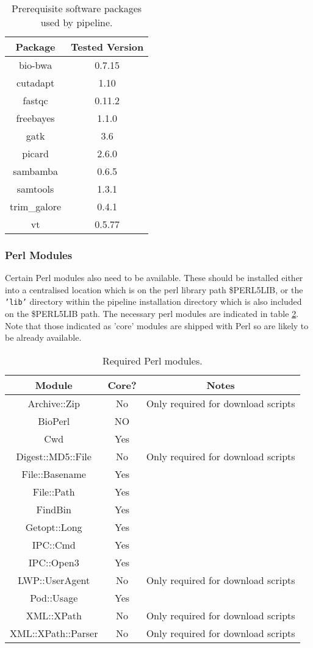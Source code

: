 \documentclass[a4paper,10pt,twoside]{article}
\begin{document}
\begin{table}
{\scriptsize
\begin{tabularx}{100pt}{@{}cc@{}}\toprule
Package	& Tested Version \\\midrule
bio-bwa		&	0.7.15 \\
cutadapt	&	1.10 \\
fastqc		&	0.11.2 \\
freebayes	&	1.1.0 \\
gatk		&	3.6 \\
picard		&	2.6.0 \\
sambamba	&	0.6.5 \\
samtools	&	1.3.1 \\
trim\_galore	&	0.4.1 \\
vt	&	0.5.77 \\\hline
\end{tabularx}}{}
\caption{Prerequisite software packages used by pipeline.\label{tab:01}} 
\end{table}

\subsubsection{Perl Modules}

Certain Perl modules also need to be available. These should be installed
either into a centralised location which is on the perl library path
\$PERL5LIB, or the {\tt 'lib'} directory within the pipeline installation
directory which is also included on the \$PERL5LIB path. The necessary perl
modules are indicated in table \ref{tab:02}. Note that those indicated as
'core' modules are shipped with Perl so are likely to be already available.

\begin{table}
{\scriptsize
\begin{tabularx}{250pt}{@{}ccc@{}}\toprule
Module & Core? & Notes \\\midrule
Archive::Zip & No & Only required for download scripts \\
BioPerl & NO & \\
Cwd & Yes & \\
Digest::MD5::File & No & Only required for download scripts  \\
File::Basename & Yes & \\
File::Path & Yes & \\
FindBin & Yes & \\
Getopt::Long & Yes & \\
IPC::Cmd & Yes & \\
IPC::Open3 & Yes & \\
LWP::UserAgent & No & Only required for download scripts  \\
Pod::Usage & Yes & \\
XML::XPath & No & Only required for download scripts \\
XML::XPath::Parser & No & Only required for download scripts \\\hline
\end{tabularx}}{}
\caption{Required Perl modules.\label{tab:02}} 
\end{table}
\end{document}
